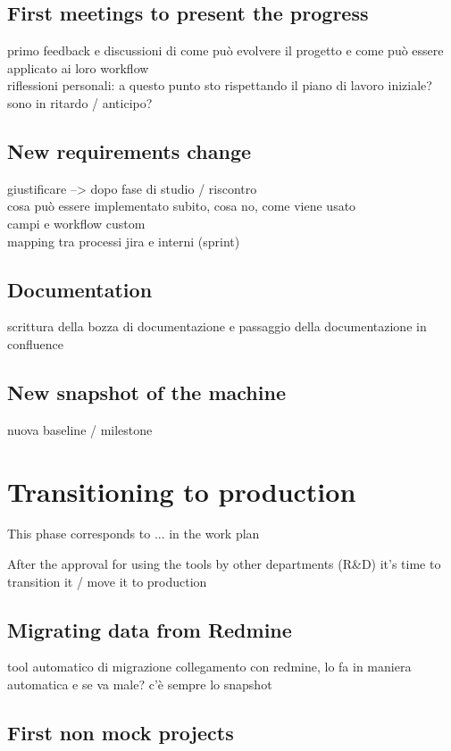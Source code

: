 	\subsection{First meetings to present the progress}
		primo feedback e discussioni di come può evolvere il progetto e come può essere applicato ai loro workflow\\
		riflessioni personali: a questo punto sto rispettando il piano di lavoro iniziale? sono in ritardo / anticipo?
	
	\subsection{New requirements change}
		giustificare --> dopo fase di studio / riscontro\\
		cosa può essere implementato subito, cosa no, come viene usato\\
		campi e workflow custom\\
		mapping tra processi jira e interni (sprint)
	
	\subsection{Documentation}
		scrittura della bozza di documentazione e passaggio della documentazione in confluence
		
	\subsection{New snapshot of the machine}
		nuova baseline / milestone

\section{Transitioning to production}

	This phase corresponds to ... in the work plan

	After the approval for using the tools by other departments (R\&D) it's time to transition it / move it to production
	
	\subsection{Migrating data from Redmine}
		tool automatico di migrazione
		collegamento con redmine, lo fa in maniera automatica
		e se va male? c'è sempre lo snapshot
	
	\subsection{First non mock projects}
	
